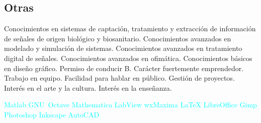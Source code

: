 \documentclass[11pt,a4paper,sans,spanish]{moderncv}
\begin{document}
\subsection{Otras}
Conocimientos en sistemas de captación, tratamiento y extracción de información de señales de origen biológico y biosanitario.\quad
Conocimientos avanzados en modelado y simulación de sistemas.\quad
Conocimientos avanzados en tratamiento digital de señales.\quad
Conocimientos avanzados en ofimática.\quad
Conocimientos básicos en diseño gráfico.\quad
Permiso de conducir B. \quad{} Carácter fuertemente emprendedor. \quad{} Trabajo en equipo. \quad{} Facilidad para hablar en público. \quad{} Gestión de proyectos. \quad{} Interés en el arte y la cultura. \quad{} Interés en la enseñanza.

\begin{center}
\textcolor{cyan}{
Matlab \quad{} GNU~Octave \quad{} Mathematica \quad{} LabView \quad{} wxMaxima \quad{} LaTeX \quad{} LibreOffice \quad{} Gimp \quad{} Photoshop \quad{} Inkscape \quad{} AutoCAD
}
\end{center}
\end{document}
